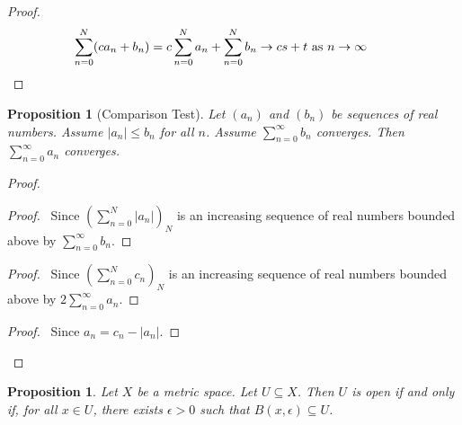 \documentclass{book}
\let\qed\relax
\newtheorem{prop}[ax]{Proposition}
\theoremstyle{definition}
\begin{document}
\begin{proof}
\pf
\[ \sum_{n=0}^N (c a_n + b_n) = c \sum_{n=0}^N a_n + \sum_{n=0}^N b_n \rightarrow cs + t \text{ as } n \rightarrow \infty \qquad \qed \]
\end{proof}

\begin{prop}[Comparison Test]
Let $(a_n)$ and $(b_n)$ be sequences of real numbers. Assume $|a_n| \leq b_n$ for all $n$. Assume $\sum_{n=0}^\infty b_n$ converges. Then $\sum_{n=0}^\infty a_n$ converges.
\end{prop}

\begin{proof}
\pf
{}
\begin{proof}
	\pf\ Since $(\sum_{n=0}^N |a_n|)_N$ is an increasing sequence of real numbers bounded above by $\sum_{n=0}^\infty b_n$.
\end{proof}
\begin{proof}
	\pf\ Since $(\sum_{n=0}^N c_n)_N$ is an increasing sequence of real numbers bounded above by $2 \sum_{n=0}^\infty a_n$.
\end{proof}
\begin{proof}
	\pf\ Since $a_n = c_n - |a_n|$.
\end{proof}
\qed
\end{proof}

\begin{prop}
\label{prop:metric_open}
Let $X$ be a metric space. Let $U \subseteq X$. Then $U$ is open if and only if, for all $x \in U$, there exists $\epsilon > 0$ such that $B(x, \epsilon) \subseteq U$.
\end{prop}
\end{document}
